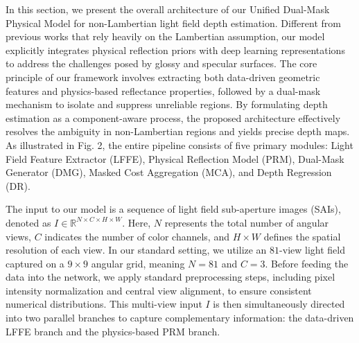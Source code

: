 \documentclass[lettersize,journal]{IEEEtran}
\begin{document}
In this section, we present the overall architecture of our Unified Dual-Mask Physical Model for non-Lambertian light field depth estimation. Different from previous works that rely heavily on the Lambertian assumption, our model explicitly integrates physical reflection priors with deep learning representations to address the challenges posed by glossy and specular surfaces. The core principle of our framework involves extracting both data-driven geometric features and physics-based reflectance properties, followed by a dual-mask mechanism to isolate and suppress unreliable regions. By formulating depth estimation as a component-aware process, the proposed architecture effectively resolves the ambiguity in non-Lambertian regions and yields precise depth maps. As illustrated in Fig. 2, the entire pipeline consists of five primary modules: Light Field Feature Extractor (LFFE), Physical Reflection Model (PRM), Dual-Mask Generator (DMG), Masked Cost Aggregation (MCA), and Depth Regression (DR).

The input to our model is a sequence of light field sub-aperture images (SAIs), denoted as $I \in \mathbb{R}^{N \times C \times H \times W}$. Here, $N$ represents the total number of angular views, $C$ indicates the number of color channels, and $H \times W$ defines the spatial resolution of each view. In our standard setting, we utilize an $81$-view light field captured on a $9 \times 9$ angular grid, meaning $N=81$ and $C=3$. Before feeding the data into the network, we apply standard preprocessing steps, including pixel intensity normalization and central view alignment, to ensure consistent numerical distributions. This multi-view input $I$ is then simultaneously directed into two parallel branches to capture complementary information: the data-driven LFFE branch and the physics-based PRM branch.
\end{document}

